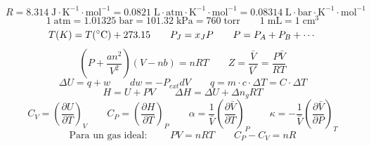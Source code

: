 \documentclass[a4paper,12pt]{article}
\begin{document}
\begin{enumerate}
$$R=8.314\;\mbox{J}\cdot\mbox{K}^{-1}\cdot\mbox{mol}^{-1}=0.0821\;\mbox{L}\cdot\mbox{atm}\cdot\mbox{K}^{-1}\cdot\mbox{mol}^{-1}=0.08314\;\mbox{L}\cdot\mbox{bar}\cdot\mbox{K}^{-1}\cdot\mbox{mol}^{-1}$$
$$1\;\mbox{atm}=1.01325\;\mbox{bar}=101.32\;\mbox{kPa}=760\;\mbox{torr}\quad\quad 1\;\mbox{mL}=1\;\mbox{cm}^3$$
$$T(K)=T(\celsius)+273.15\quad\quad P_J=x_JP\quad\quad P=P_A+P_B+\cdots$$
$$\left(P+\frac{an^2}{V^2}\right)(V-nb)=nRT \quad\quad Z=\frac{\bar{V}}{\bar{V}^\circ}=\frac{P\bar{V}}{RT}$$
$$\Delta U=q+w\quad\quad dw=-P_{ext}dV\quad\quad q=m\cdot c\cdot\Delta T=C\cdot\Delta T$$
$$H=U+PV\quad\quad \Delta H=\Delta U+\Delta n_g RT$$
$$C_V=\left(\frac{\partial U}{\partial T}\right)_V\quad\quad C_P=\left(\frac{\partial H}{\partial T}\right)_P\quad\quad \alpha=\frac{1}{\bar{V}}\left(\frac{\partial \bar{V}}{\partial T}\right)_P \quad\quad \kappa=-\frac{1}{\bar{V}}\left(\frac{\partial \bar{V}}{\partial P}\right)_T$$
$$\mbox{Para un gas ideal: }\quad\quad PV=nRT\quad\quad C_P-C_V=nR$$

\end{enumerate}
\end{document}
